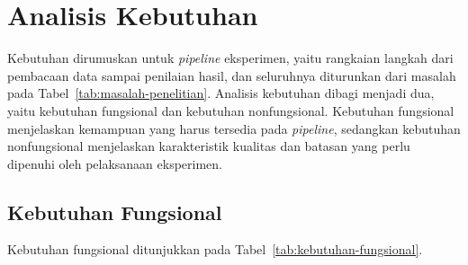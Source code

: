 \section{Analisis Kebutuhan}
\label{sec:kebutuhan-penelitian}
Kebutuhan dirumuskan untuk \textit{pipeline} eksperimen, yaitu rangkaian langkah dari pembacaan data sampai penilaian hasil, dan seluruhnya diturunkan dari masalah pada Tabel~\ref{tab:masalah-penelitian}.
Analisis kebutuhan dibagi menjadi dua, yaitu kebutuhan fungsional dan kebutuhan nonfungsional.
Kebutuhan fungsional menjelaskan kemampuan yang harus tersedia pada \textit{pipeline}, sedangkan kebutuhan nonfungsional menjelaskan karakteristik kualitas dan batasan yang perlu dipenuhi oleh pelaksanaan eksperimen.

\subsection{Kebutuhan Fungsional}
Kebutuhan fungsional ditunjukkan pada Tabel~\ref{tab:kebutuhan-fungsional}.

